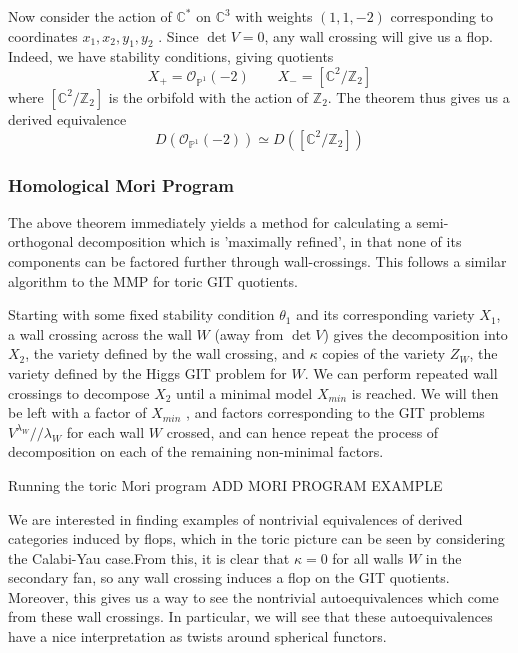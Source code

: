 \begin{example}{}{}
    Now consider the action of $\mathbb{C}^{*}$ on $\mathbb{C}^3$ with weights $(1,1,-2)$ corresponding to coordinates $x_{1},x_{2},y_1,y_2$ .  Since $\det V = 0$, any wall crossing will give us a flop. Indeed, we have stability conditions, giving quotients $$X_{+}= \mathcal{O}_{\mathbb{P}^{1}}(-2) \qquad X_{-}= [\mathbb{C}^{2}/ \mathbb{Z}_2]  $$where $[\mathbb{C}^2/\mathbb{Z}_2]$ is the orbifold with the action of $\mathbb{Z}_2$. The theorem thus gives us a derived equivalence $$D(\mathcal{O}_{\mathbb{P}^{1}}(-2))\simeq D([\mathbb{C}^{2}/\mathbb{Z}_{2}])$$
\end{example}


\subsubsection{Homological Mori Program}

The above theorem immediately yields a method for calculating a semi-orthogonal decomposition which is 'maximally refined', in that none of its components can be factored further through wall-crossings. This follows a similar algorithm to the MMP for toric GIT quotients. 

Starting with some fixed stability condition $\theta _1$ and its corresponding variety $X_1$, a wall crossing across the wall $W$ (away from $\det V$) gives the decomposition into $X_2$, the variety defined by the wall crossing, and $\kappa$ copies of the variety $Z_W$, the variety defined by the Higgs GIT problem for $W$. We can perform repeated wall crossings to decompose $X_2$ until a minimal model $X_{min}$ is reached. We will then be left with a factor of $X_{min}$ , and factors corresponding to the GIT problems $V^{\lambda_{W}} / / \lambda_{W}$ for each wall $W$ crossed, and can hence repeat the process of decomposition on each of the remaining non-minimal factors.

\begin{example}{Running the toric Mori program}{}
	ADD MORI PROGRAM EXAMPLE
\end{example}

We are interested in finding examples of nontrivial equivalences of derived categories induced by flops, which in the toric picture can be seen by considering the Calabi-Yau case.From this, it is clear that $\kappa = 0$ for all walls $W$ in the secondary fan, so any wall crossing induces a flop on the GIT quotients. Moreover, this gives us a way to see the nontrivial autoequivalences which come from these wall crossings. In particular, we will see that these autoequivalences have a nice interpretation as twists around spherical functors. 


